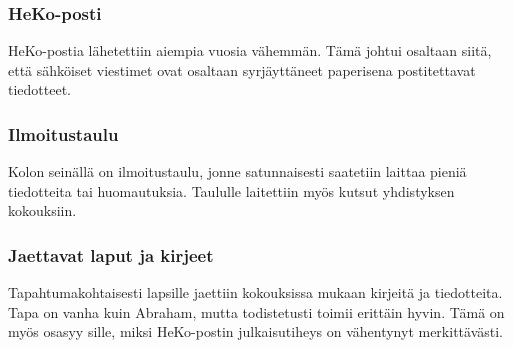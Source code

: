 \subsubsection{HeKo-posti}
HeKo-postia lähetettiin aiempia vuosia vähemmän. Tämä johtui osaltaan siitä, että sähköiset viestimet ovat osaltaan syrjäyttäneet paperisena postitettavat tiedotteet.
\subsubsection{Ilmoitustaulu}
Kolon seinällä on ilmoitustaulu, jonne satunnaisesti saatetiin laittaa pieniä tiedotteita tai huomautuksia. Taululle laitettiin myös kutsut yhdistyksen kokouksiin.
\subsubsection{Jaettavat laput ja kirjeet}
Tapahtumakohtaisesti lapsille jaettiin kokouksissa mukaan kirjeitä ja tiedotteita. Tapa on vanha kuin Abraham, mutta todistetusti toimii erittäin hyvin. Tämä on myös osasyy sille, miksi HeKo-postin julkaisutiheys on vähentynyt merkittävästi.
\newpage

